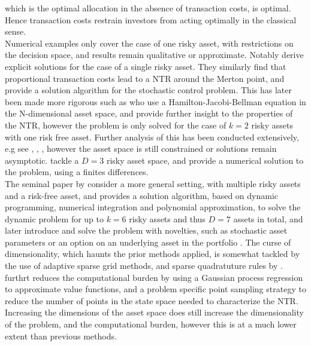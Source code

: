\documentclass[11pt]{article}
\begin{document}
which is the optimal allocation in the absence of transaction costs, is optimal. Hence transaction costs restrain
investors from acting optimally in the classical sense.\\
Numerical examples only cover the case of one risky asset, with restrictions on the decision space, and results remain qualitative or approximate.
Notably \textcite{DavisNorman1990} derive explicit solutions for the case of a single risky asset.
They similarly find that proportional transaction costs lead to a \ac{NTR} around the Merton point, and provide a solution algorithm for the stochastic control problem.
This has later been made more rigorous such as 
\textcite{Aikan1996} who use a Hamilton-Jacobi-Bellman equation in the N-dimensional asset space, and provide further insight to the properties of the \ac{NTR}, however the problem is only solved for the case of $k=2$ risky assets with one risk free asset.
Further analysis of this has been conducted extensively, e.g see \textcite{ShreveSoner1994}, \textcite{Oksendal2002}, \textcite{JanecekShreve2004}, however 
the asset space is still constrained or solutions remain asymptotic. 
\textcite{Muthuraman2006,Muthuraman2008} tackle a $D=3$ risky asset space, and provide a numerical solution to the problem, using a finites differences.\\
The seminal paper by \textcite{CaiJuddXu2013} consider a more general setting, with multiple risky assets and a risk-free asset,
and provides a solution algorithm, based on dynamic programming, numerical integration and polynomial approximation,
to solve the dynamic problem for up to $k=6$ risky assets and thus $D=7$ assets in total,
and later introduce and solve the problem with novelties, such as stochastic asset parameters
or an option on an underlying asset in the portfolio \textcite{CaiJuddXu2020}.
The curse of dimensionality, which haunts the prior methods applied, is somewhat tackled by the use
of adaptive sparse grid methods, and sparse quadratuture rules by \textcite{Schober2022}.\\
\textcite{Scheidegger2023} furthrt reduces the computational burden by using a Gaussian process regression
to approximate value functions, and a problem specific point sampling strategy to reduce the number of points in the state space
needed to characterize the \ac{NTR}.
Increasing the dimensions of the asset space does still increase the dimensionality of the problem, and the computational burden,
however this is at a much lower extent than previous methods.\\
\end{document}
